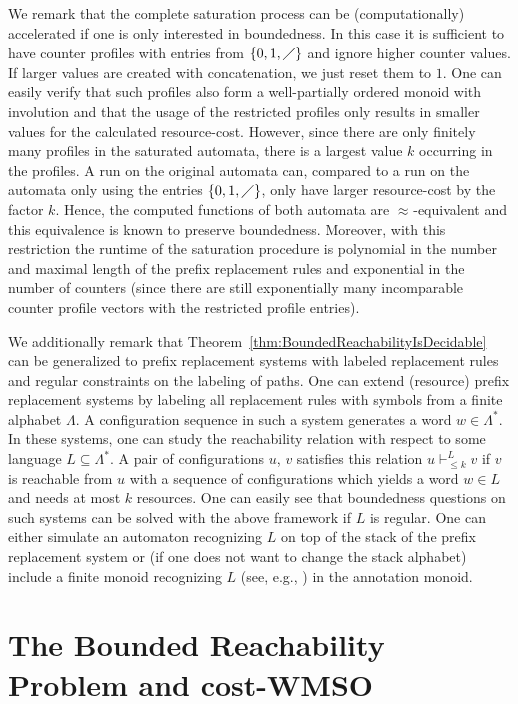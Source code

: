 \documentclass{LMCS}
\newcommand{\costEquiv}[1][\alpha]{\approx_{#1}}
\newcommand{\na}{\diagup}
\newcommand{\configstepsLesserCostLangRestrict}[2]{\vdash^{#1}_{\le
#2}}
\begin{document}
We remark that the complete saturation process can be (computationally) accelerated
if one is only interested in boundedness. In this case it is sufficient to have counter
profiles with entries from $\{0,1,\na\}$ and ignore higher counter values. 
If larger values are created with concatenation, we just reset them to $1$. 
One can easily verify that such profiles also form a well-partially ordered 
monoid with involution and that the usage of the restricted profiles only 
results in smaller values for the calculated resource-cost. 
However, since there are only finitely many profiles
in the saturated automata, there is a largest value $k$ occurring in the 
profiles. A run on the original automata can, compared to a run on the 
automata only using the entries $\{0,1,\na\}$, only have larger 
resource-cost by the factor $k$. Hence, the computed functions of both 
automata are $\costEquiv[]$-equivalent and this equivalence is known to 
preserve boundedness. Moreover, with this restriction the runtime of the 
saturation procedure is polynomial in the number and maximal length of the 
prefix replacement rules  and exponential in the number of counters 
(since there are still exponentially
many incomparable counter profile vectors with the restricted profile entries). 

We additionally remark that Theorem~\ref{thm:BoundedReachabilityIsDecidable}
can be generalized to prefix replacement systems with labeled replacement rules and regular constraints on
the labeling of paths. One can extend (resource) prefix replacement systems by
labeling all replacement rules with symbols from a finite alphabet $\Lambda$. A
configuration sequence in such a system generates a word $w \in \Lambda^*$. In
these systems, one can study the reachability relation with respect to some
language $L \subseteq \Lambda^*$. A pair of configurations $u$, $v$ satisfies
this relation $u \configstepsLesserCostLangRestrict{L}{k} v$ if $v$ is reachable
from $u$ with a sequence of configurations which yields a word $w \in L$ and
needs at most $k$ resources. One can easily see that boundedness
questions on such systems can be solved with the above framework if $L$ is
regular. One can either simulate an automaton recognizing $L$ on top of the
stack of the prefix replacement system or (if one does not want to change the
stack alphabet) include a finite monoid recognizing $L$ (see, e.g.,
\cite{Sakarovitch}) in the annotation monoid. 

\section{The Bounded Reachability Problem and
cost-WMSO}\label{sec:BoundedReachabilityAndCostWMSO}
\end{document}
